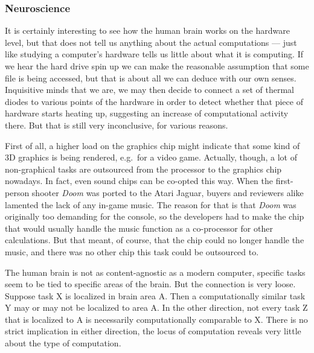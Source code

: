 \subsubsection{Neuroscience}

It is certainly interesting to see how the human brain works on the hardware level, but that does not tell us anything about the actual computations --- just like studying a computer's hardware tells us little about what it is computing.
If we hear the hard drive spin up we can make the reasonable assumption that some file is being accessed, but that is about all we can deduce with our own senses.
Inquisitive minds that we are, we may then decide to connect a set of thermal diodes to various points of the hardware in order to detect whether that piece of hardware starts heating up, suggesting an increase of computational activity there.
But that is still very inconclusive, for various reasons.

First of all, a higher load on the graphics chip might indicate that some kind of 3D graphics is being rendered, e.g.\ for a video game.
Actually, though, a lot of non-graphical tasks are outsourced from the processor to the graphics chip nowadays.
In fact, even sound chips can be co-opted this way.
When the first-person shooter \emph{Doom} was ported to the Atari Jaguar, buyers and reviewers alike lamented the lack of any in-game music.
The reason for that is that \emph{Doom} was originally too demanding for the console, so the developers had to make the chip that would usually handle the music function as a co-processor for other calculations.
But that meant, of course, that the chip could no longer handle the music, and there was no other chip this task could be outsourced to.

The human brain is not as content-agnostic as a modern computer, specific tasks seem to be tied to specific areas of the brain.
But the connection is very loose.
Suppose task X is localized in brain area A\@.
Then a computationally similar task Y may or may not be localized to area A\@.
In the other direction, not every task Z that is localized to A is necessarily computationally comparable to X\@.
There is no strict implication in either direction, the locus of computation reveals very little about the type of computation.


